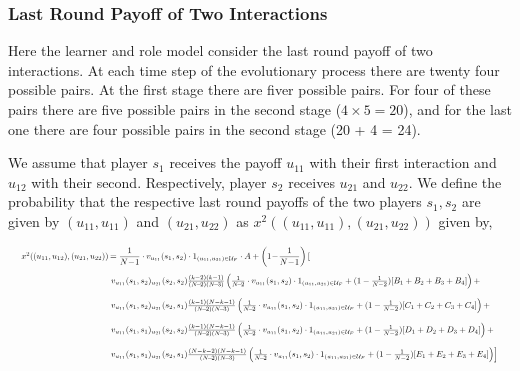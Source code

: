 \documentclass[11pt]{article}
\theoremstyle{plainCl1}
\theoremstyle{plainCl2}
\begin{document}
\subsubsection{Last Round Payoff of Two Interactions}

Here the learner and role model consider the last round payoff of two
interactions. At each time step of the evolutionary process there are twenty
four possible pairs. At the first stage there are fiver possible pairs. For four of
these pairs there are five possible pairs in the second stage (\(4 \times 5 =
20\)), and for the last one there are four possible pairs in the second stage
(20 + 4 = 24). 

We assume that player \(s_1\) receives the payoff
\(u_{11}\) with their first interaction and \(u_{12}\) with their second.
Respectively, player \(s_2\) receives \(u_{21}\) and \(u_{22}\). We define the
probability that the respective last round payoffs of the two players \(s_1,
s_2\) are given by \((u_{11}, u_{11})\) and \((u_{21}, u_{22})\) as
\(x^{2}((u_{11}, u_{11}), (u_{21}, u_{22}))\) given by,

\begin{equation}
  \resizebox{.99\textwidth}{!}
  {%
$
  \setlength{\arraycolsep}{1pt}
  \begin{array}{llrl}
  x^{2}((u_{11}, u_{12}), (u_{21}, u_{22}))	& = \displaystyle \frac{1}{N\!-\!1}\cdot v_{u_{11}}(s_1,s_2)\cdot 1_{(u_{11},u_{21})\in \mathcal{U}_F} \cdot A + \left(1\!-\!\frac{1}{N\!-\!1}\right) \left[ \right. \\[0.5cm] 
  & \left. v_{u_{11}}(s_1,s_2) _{u_{21}}(s_2,s_2)  \frac{\left(k - 2\right) \left(k - 1\right)}{(N\!-\!2)(N\!-\!3)}
  \left(\frac{1}{N\!-\!2}\cdot v_{u_{11}}(s_1,s_2)\cdot 1_{(u_{11},u_{21})\in \mathcal{U}_F} + (1 - \frac{1}{N - 2}) [B_1 + B_2 + B_3 + B_4]\right) + \right. \\[0.5cm] 
  & \left. v_{u_{11}}(s_1,s_2) _{u_{21}}(s_2,s_1)  \frac{\left(k - 1\right) \left(N - k - 1\right)}{(N\!-\!2)(N\!-\!3)} \left(\frac{1}{N\!-\!2}\cdot v_{u_{11}}(s_1,s_2)\cdot 1_{(u_{11},u_{21})\in \mathcal{U}_F} + (1 - \frac{1}{N - 2}) [C_1 + C_2 + C_3 + C_4]\right) + \right. \\[0.5cm] 
  & \left. v_{u_{11}}(s_1,s_1) _{u_{21}}(s_2,s_2)  \frac{\left(k - 1\right) \left(N - k - 1\right)}{(N\!-\!2)(N\!-\!3)} \left(\frac{1}{N\!-\!2}\cdot v_{u_{11}}(s_1,s_2)\cdot 1_{(u_{11},u_{21})\in \mathcal{U}_F} + (1 - \frac{1}{N - 2}) [D_1 + D_2 + D_3 + D_4]\right) + \right. \\[0.5cm] 
  & \left. v_{u_{11}}(s_1,s_1) _{u_{21}}(s_2,s_1)  \frac{\left(N - k - 2\right) \left(N - k - 1\right)}{(N\!-\!2)(N\!-\!3)} \left(\frac{1}{N\!-\!2}\cdot v_{u_{11}}(s_1,s_2)\cdot 1_{(u_{11},u_{21})\in \mathcal{U}_F} + (1 - \frac{1}{N - 2}) [E_1 + E_2 + E_3 + E_4]\right) \right]
  \end{array} $}
\end{equation}
\end{document}
